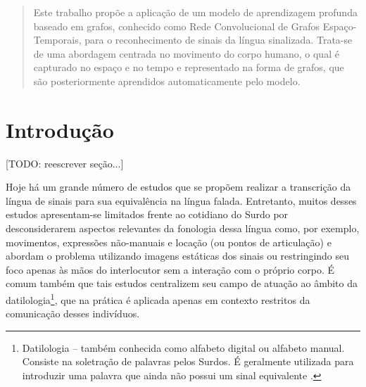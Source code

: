 

\maketitle
\begin{abstract}
Este trabalho propõe a aplicação de um modelo de aprendizagem profunda baseado em grafos, conhecido como Rede Convolucional de Grafos Espaço-Temporais, para o reconhecimento de sinais da língua sinalizada. Trata-se de uma abordagem centrada no movimento do corpo humano, o qual é capturado no espaço e no tempo e representado na forma de grafos, que são posteriormente aprendidos automaticamente pelo modelo.
\end{abstract}



\section{Introdução} %
\label{sec:introducao}

[TODO: reescrever seção...]

Hoje há um grande número de estudos que se propõem realizar a transcrição da língua de sinais para sua equivalência na língua falada. Entretanto, muitos desses estudos apresentam-se limitados frente ao cotidiano do Surdo por desconsiderarem aspectos relevantes da fonologia dessa língua como, por exemplo, movimentos, expressões não-manuais e locação (ou pontos de articulação) \cite{quadros-2004} e abordam o problema utilizando imagens estáticas dos sinais ou restringindo seu foco apenas às mãos do interlocutor sem a interação com o próprio corpo. É comum também que tais estudos centralizem seu campo de atuação ao âmbito da datilologia\footnote{
     Datilologia – também conhecida como alfabeto digital ou alfabeto manual. Consiste na soletração de palavras pelos Surdos. É geralmente utilizada para introduzir uma palavra que ainda não possui um sinal equivalente \cite{quadros-2004, pereira-choi-2011}.
}, que na prática é aplicada apenas em contexto restritos da comunicação desses indivíduos.


